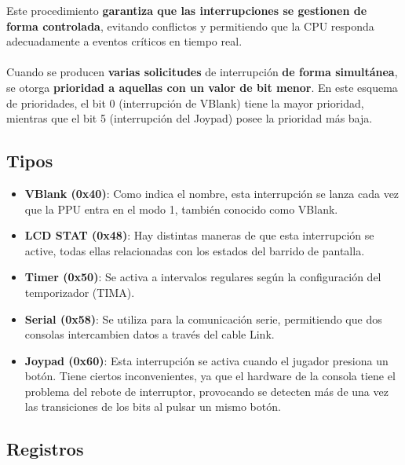 Este procedimiento \textbf{garantiza que las interrupciones se gestionen de forma controlada}, evitando conflictos y permitiendo que la CPU responda adecuadamente a eventos críticos en tiempo real.
\\\\
Cuando se producen \textbf{varias solicitudes} de interrupción \textbf{de forma simultánea}, se otorga \textbf{prioridad a aquellas con un valor de bit menor}. En este esquema de prioridades, el bit 0 (interrupción de VBlank) tiene la mayor prioridad, mientras que el bit 5 (interrupción del Joypad) posee la prioridad más baja.

\subsection{Tipos}

\begin{itemize}
    \item \textbf{VBlank (0x40)}: Como indica el nombre, esta interrupción se lanza cada vez que la PPU entra en el modo 1, también conocido como VBlank.
    \item \textbf{LCD STAT (0x48)}: Hay distintas maneras de que esta interrupción se active, todas ellas relacionadas con los estados del barrido de pantalla.
    \item \textbf{Timer (0x50)}: Se activa a intervalos regulares según la configuración del temporizador (TIMA).
    \item \textbf{Serial (0x58)}: Se utiliza para la comunicación serie, permitiendo que dos consolas intercambien datos a través del cable Link.
    \item \textbf{Joypad (0x60)}: Esta interrupción se activa cuando el jugador presiona un botón. Tiene ciertos inconvenientes, ya que el hardware de la consola tiene el problema del rebote de interruptor, provocando se detecten más de una vez las transiciones de los bits al pulsar un mismo botón.
\end{itemize}
\label{interrupttype}

\subsection{Registros}

